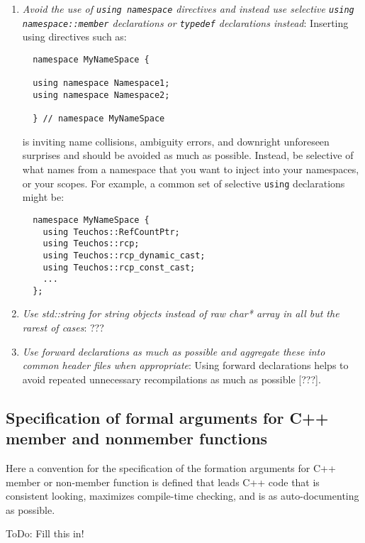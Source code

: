 \begin{enumerate}
{}\item\textit{Avoid the use of {}\texttt{using namespace} directives and
instead use selective {}\texttt{using namespace\-::member} declarations or
{}\texttt{typedef} declarations instead}: Inserting using directives such as:

{\small\begin{verbatim}
  namespace MyNameSpace {

  using namespace Namespace1;
  using namespace Namespace2;

  } // namespace MyNameSpace

\end{verbatim}}

is inviting name collisions, ambiguity errors, and downright unforeseen
surprises and should be avoided as much as possible.  Instead, be selective of
what names from a namespace that you want to inject into your namespaces, or
your scopes.  For example, a common set of selective {}\texttt{using}
declarations might be:

{\small\begin{verbatim}
  namespace MyNameSpace {
    using Teuchos::RefCountPtr;
    using Teuchos::rcp;
    using Teuchos::rcp_dynamic_cast;
    using Teuchos::rcp_const_cast;
    ...
  };
\end{verbatim}}

{}\item\textit{Use std::string for string objects instead of raw char* array
in all but the rarest of cases}: ???

{}\item\textit{Use forward declarations as much as possible and aggregate
these into common header files when appropriate}: Using forward declarations
helps to avoid repeated unnecessary recompilations as much as possible [???].

\end{enumerate}

%
\subsection{Specification of formal arguments for C++ member and nonmember functions}
%

Here a convention for the specification of the formation arguments for C++
member or non-member function is defined that leads C++ code that is
consistent looking, maximizes compile-time checking, and is as
auto-documenting as possible.

ToDo: Fill this in!

